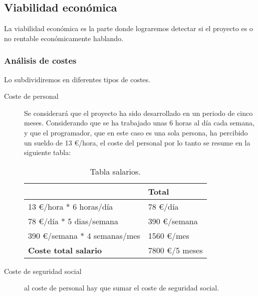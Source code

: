 \subsection{Viabilidad económica}\label{viabilidad-economica}

La viabilidad económica es la parte donde lograremos detectar si el proyecto es o no rentable económicamente hablando.

\subsubsection{Análisis de costes}\label{costes}

Lo subdividiremos en diferentes tipos de costes.

\begin{description}
	\item[Coste de personal] Se considerará que el proyecto ha sido desarrollado en un periodo de cinco meses.  Considerando que se ha trabajado unas 6 horas al día cada semana, y que el programador, que en este caso es una sola persona, ha percibido un sueldo de 13 \euro /hora, el coste del personal por lo tanto se resume en la siguiente tabla:
	
\begin{table}[htbp]
\begin{center}
\begin{tabular}{|l|l|}
\hline
 & Total \\
\hline \hline
13 \euro /hora * 6 horas/día &   78 \euro /día \\ \hline
78 \euro /día * 5 dias/semana &   390 \euro /semana \\ \hline
390 \euro /semana * 4 semanas/mes &   1560 \euro /mes \\ \hline
\textbf{Coste total salario} &   7800 \euro /5 meses \\ \hline
\end{tabular}
\caption{Tabla salarios.}
\label{tabla:salarios}
\end{center}
\end{table}
	
	\item[Coste de seguridad social] al coste de personal hay que sumar el coste de seguridad social. 
	

\end{description}
